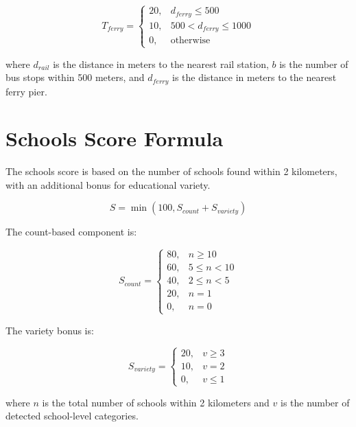 \begin{equation}
T_{ferry} =
\begin{cases}
20, & d_{ferry} \leq 500 \\
10, & 500 < d_{ferry} \leq 1000 \\
0, & \text{otherwise}
\end{cases}
\end{equation}

where $d_{rail}$ is the distance in meters to the nearest rail station, $b$ is the number of bus stops within 500 meters, and $d_{ferry}$ is the distance in meters to the nearest ferry pier.

\section{Schools Score Formula}

The schools score is based on the number of schools found within 2 kilometers, with an additional bonus for educational variety.

\begin{equation}
\label{eq:appendix-schools-score}
S = \min(100, S_{count} + S_{variety})
\end{equation}

The count-based component is:

\begin{equation}
S_{count} =
\begin{cases}
80, & n \geq 10 \\
60, & 5 \leq n < 10 \\
40, & 2 \leq n < 5 \\
20, & n = 1 \\
0, & n = 0
\end{cases}
\end{equation}

The variety bonus is:

\begin{equation}
S_{variety} =
\begin{cases}
20, & v \geq 3 \\
10, & v = 2 \\
0, & v \leq 1
\end{cases}
\end{equation}

where $n$ is the total number of schools within 2 kilometers and $v$ is the number of detected school-level categories.

